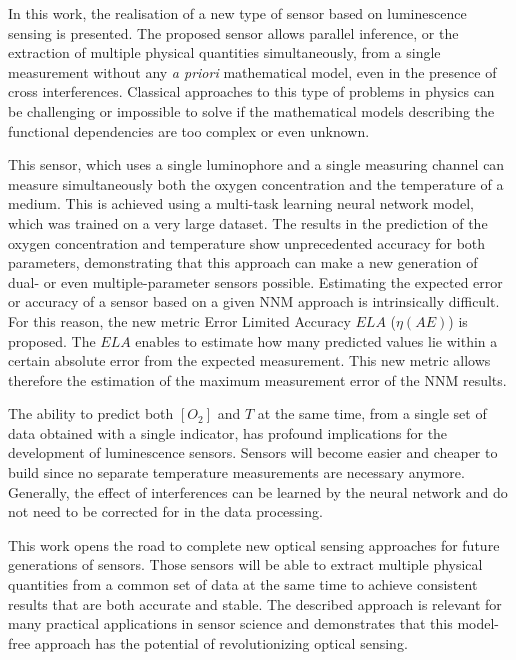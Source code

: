 \documentclass[sensors,article,submit,moreauthors,pdftex,10pt,a4paper]{Definitions/mdpi}
\begin{document}
In this work, the realisation of a new type of sensor based on luminescence sensing is presented. The proposed sensor allows parallel inference, or the extraction of multiple physical quantities simultaneously, from a single measurement without any {\sl a priori} mathematical model, even in the presence of cross interferences. Classical approaches to this type of problems in physics can be challenging or impossible to solve if the mathematical models describing the functional dependencies are too complex or even unknown.

This sensor, which uses a single luminophore and a single measuring channel can measure simultaneously both the oxygen concentration and the temperature of a medium. This is achieved using a multi-task learning neural network model, which was trained on a very large dataset. The results in the prediction of the oxygen concentration and temperature show unprecedented accuracy for both parameters, demonstrating that this approach can make a new generation of dual- or even multiple-parameter sensors possible.
Estimating the expected error or accuracy of a sensor based on a given NNM approach is intrinsically difficult. For this reason, the new metric Error Limited Accuracy $ELA$ ($\eta(AE)$) is proposed. The $ELA$ enables to estimate how many predicted values lie within a certain absolute error from the expected measurement. This new metric allows therefore the estimation of the maximum measurement error of the NNM results.

The ability to predict both $[O_2]$ and $T$ at the same time, from a single set of data obtained with a single indicator, has profound implications for the development of luminescence sensors. Sensors will become easier and cheaper to build since no separate temperature measurements are necessary anymore. Generally, the effect of interferences can be learned by the neural network and do not need to be corrected for in the data processing. 

This work opens the road to complete new optical sensing approaches for future generations of sensors. Those sensors will be able to extract multiple physical quantities from a common set of data at the same time to achieve consistent results that are both accurate and stable. The described approach is relevant for many practical applications in sensor science and demonstrates that this model-free approach has the potential of revolutionizing optical sensing.




\vspace{6pt} 
\end{document}
